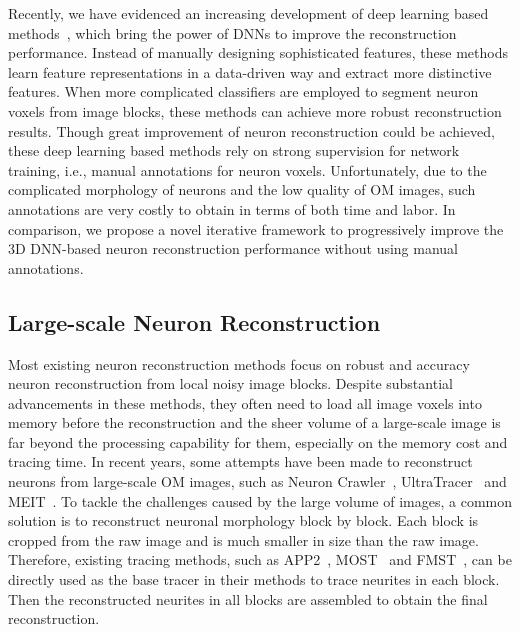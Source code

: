 Recently, we have evidenced an increasing development of deep learning based methods~\cite{Li2017, Zhou2018, Xu2016}, which bring the power of DNNs to improve the reconstruction performance. Instead of manually designing sophisticated features, these methods learn feature representations in a data-driven way and extract more distinctive features. When more complicated classifiers are employed to segment neuron voxels from image blocks, these methods can achieve more robust reconstruction results. 
Though great improvement of neuron reconstruction could be achieved, these deep learning based methods rely on strong supervision for network training, i.e., manual annotations for neuron voxels.
Unfortunately, due to the complicated morphology of neurons and the low quality of OM images, such annotations are very costly to obtain in terms of both time and labor.
%
In comparison, we propose a novel iterative framework to progressively improve the 3D DNN-based neuron reconstruction performance without using manual annotations.


\subsection{Large-scale Neuron Reconstruction}
\label{sec:largescale}

Most existing neuron reconstruction methods focus on robust and accuracy neuron reconstruction from local noisy image blocks. Despite substantial advancements in these methods, they often need to load all image voxels into memory before the reconstruction and the sheer volume of a large-scale image is far beyond the processing capability for them, especially on the memory cost and tracing time.
%
In recent years, some attempts have been made to reconstruct neurons from large-scale OM images, such as Neuron Crawler~\cite{Zhou2015}, UltraTracer~\cite{Peng2017} and MEIT~\cite{Wang2018}.
To tackle the challenges caused by the large volume of images, a common solution is to reconstruct neuronal morphology block by block. Each block is cropped from the raw image and is much smaller in size than the raw image.
Therefore, existing tracing methods, such as APP2~\cite{Xiao2013}, MOST~\cite{Wu2014} and FMST~\cite{Yang2018}, can be directly used as the base tracer in their methods to trace neurites in each block. Then the reconstructed neurites in all blocks are assembled to obtain the final reconstruction.


